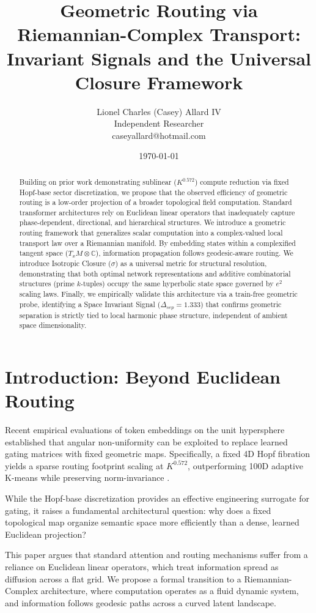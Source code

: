 \documentclass[11pt,twoside,a4paper]{article}
\title{Geometric Routing via Riemannian-Complex Transport: \\
Invariant Signals and the Universal Closure Framework}
\author{Lionel Charles (Casey) Allard IV \\ 
\small Independent Researcher \\
\small caseyallard@hotmail.com}
\date{\today}
\begin{document}
\maketitle

\begin{abstract}
Building on prior work demonstrating sublinear ($K^{0.572}$) compute reduction via fixed Hopf-base sector discretization, we propose that the observed efficiency of geometric routing is a low-order projection of a broader topological field computation. Standard transformer architectures rely on Euclidean linear operators that inadequately capture phase-dependent, directional, and hierarchical structures. We introduce a geometric routing framework that generalizes scalar computation into a complex-valued local transport law over a Riemannian manifold. By embedding states within a complexified tangent space ($T_xM \otimes \mathbb{C}$), information propagation follows geodesic-aware routing. We introduce Isotropic Closure ($\sigma$) as a universal metric for structural resolution, demonstrating that both optimal network representations and additive combinatorial structures (prime $k$-tuples) occupy the same hyperbolic state space governed by $e^2$ scaling laws. Finally, we empirically validate this architecture via a train-free geometric probe, identifying a Space Invariant Signal ($\Delta_{sep} = 1.333$) that confirms geometric separation is strictly tied to local harmonic phase structure, independent of ambient space dimensionality. 
\end{abstract}

\section{Introduction: Beyond Euclidean Routing}
Recent empirical evaluations of token embeddings on the unit hypersphere established that angular non-uniformity can be exploited to replace learned gating matrices with fixed geometric maps. Specifically, a fixed 4D Hopf fibration yields a sparse routing footprint scaling at $K^{0.572}$, outperforming 100D adaptive K-means while preserving norm-invariance \cite{allard2026angular}. 

While the Hopf-base discretization provides an effective engineering surrogate for gating, it raises a fundamental architectural question: why does a fixed topological map organize semantic space more efficiently than a dense, learned Euclidean projection? 

This paper argues that standard attention and routing mechanisms suffer from a reliance on Euclidean linear operators, which treat information spread as diffusion across a flat grid. We propose a formal transition to a Riemannian-Complex architecture, where computation operates as a fluid dynamic system, and information follows geodesic paths across a curved latent landscape.
\end{document}
